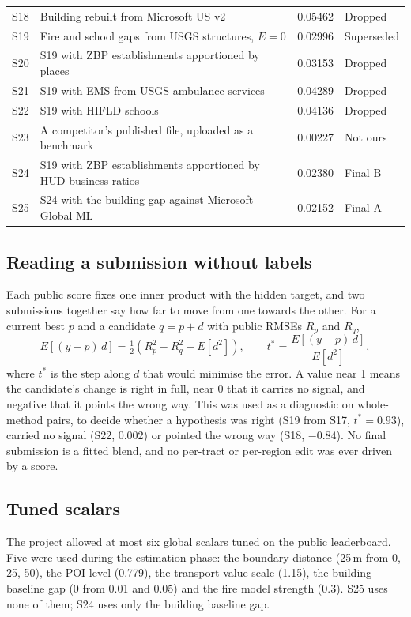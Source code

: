 \documentclass[11pt]{article}
\begin{document}
\begin{table}[htbp]
{\begin{tabular}{llrl}
S18 & Building rebuilt from Microsoft US v2 & 0.05462 & Dropped \\
S19 & Fire and school gaps from USGS structures, $E = 0$ & 0.02996 & Superseded \\
S20 & S19 with ZBP establishments apportioned by places & 0.03153 & Dropped \\
S21 & S19 with EMS from USGS ambulance services & 0.04289 & Dropped \\
S22 & S19 with HIFLD schools & 0.04136 & Dropped \\
S23 & A competitor's published file, uploaded as a benchmark & 0.00227 & Not ours \\
S24 & S19 with ZBP establishments apportioned by HUD business ratios & 0.02380 & Final B \\
S25 & S24 with the building gap against Microsoft Global ML & 0.02152 & Final A \\
\bottomrule
\end{tabular}}
\end{table}

\subsection{Reading a submission without labels}

Each public score fixes one inner product with the hidden target, and two
submissions together say how far to move from one towards the other. For a
current best $p$ and a candidate $q = p + d$ with public RMSEs $R_p$ and
$R_q$,
\begin{equation}
E[(y - p)\,d] = \tfrac{1}{2}\left(R_p^2 - R_q^2 + E[d^2]\right), \qquad
t^\ast = \frac{E[(y-p)\,d]}{E[d^2]},
\end{equation}
where $t^\ast$ is the step along $d$ that would minimise the error. A value
near 1 means the candidate's change is right in full, near 0 that it carries
no signal, and negative that it points the wrong way. This was used as a
diagnostic on whole-method pairs, to decide whether a hypothesis was right
(S19 from S17, $t^\ast = 0.93$), carried no signal (S22, 0.002) or pointed the
wrong way (S18, $-0.84$). No final submission is a fitted blend, and no
per-tract or per-region edit was ever driven by a score.

\subsection{Tuned scalars}

The project allowed at most six global scalars tuned on the public
leaderboard. Five were used during the estimation phase: the boundary
distance (25\,m from 0, 25, 50), the POI level (0.779), the transport value
scale (1.15), the building baseline gap (0 from 0.01 and 0.05) and the fire
model strength (0.3). S25 uses none of them; S24 uses only the building
baseline gap.
\end{document}
